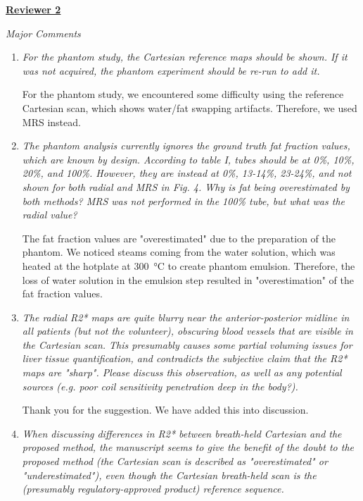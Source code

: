 \documentclass[a4paper,11pt]{report}
\begin{document}
\noindent \underline{\textbf{Reviewer 2}}

\noindent \textit{Major Comments}

\begin{enumerate}
	\item \textit{For the phantom study, the Cartesian reference maps should be shown. If it was not acquired, the phantom experiment should be re-run to add it.}

\hspace{1em} For the phantom study, 
we encountered some difficulty using the reference Cartesian scan, 
which shows water/fat swapping artifacts. Therefore, we used MRS instead.

	\item \textit{The phantom analysis currently ignores the ground truth fat fraction values, which are known by design. According to table I, tubes should be at 0\%, 10\%, 20\%, and 100\%. However, they are instead at 0\%, 13-14\%, 23-24\%, and not shown for both radial and MRS in Fig. 4. Why is fat being overestimated by both methods? MRS was not performed in the 100\% tube, but what was the radial value?}

\hspace{1em} The fat fraction values are "overestimated" due to the preparation of the phantom. We noticed steams coming from the water solution, which was heated at the hotplate at \SI{300}{\celsius} to create phantom emulsion. Therefore, the loss of water solution in the emulsion step resulted in "overestimation" of the fat fraction values.

	\item \textit{The radial R2* maps are quite blurry near the anterior-posterior midline in all patients (but not the volunteer), obscuring blood vessels that are visible in the Cartesian scan. This presumably causes some partial voluming issues for liver tissue quantification, and contradicts the subjective claim that the R2* maps are "sharp". Please discuss this observation, as well as any potential sources (e.g. poor coil sensitivity penetration deep in the body?).}

\hspace{1em} Thank you for the suggestion. We have added this into discussion.

	\item \textit{When discussing differences in R2* between breath-held Cartesian and the proposed method, the manuscript seems to give the benefit of the doubt to the proposed method (the Cartesian scan is described as "overestimated" or "underestimated"), even though the Cartesian breath-held scan is the (presumably regulatory-approved product) reference sequence.}


\end{enumerate}
\end{document}

